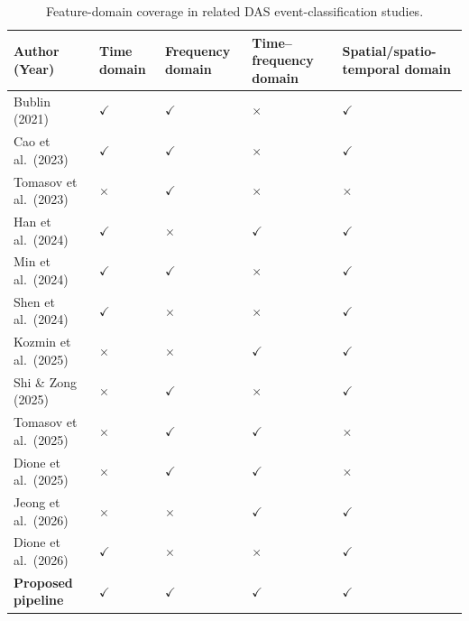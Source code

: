\begin{table}[H]
\centering
\caption{Feature-domain coverage in related DAS event-classification studies.}
\label{tab:feature-domain-coverage}
\footnotesize
\setlength{\tabcolsep}{4pt}
\renewcommand{\arraystretch}{1.25}
\begin{tabular}{@{}>{\raggedright\arraybackslash}p{4.0cm} >{\centering\arraybackslash}p{1.8cm} >{\centering\arraybackslash}p{2.1cm} >{\centering\arraybackslash}p{2.4cm} >{\centering\arraybackslash}p{3.0cm}@{}}
\toprule
\textbf{Author (Year)} & \textbf{Time domain} & \textbf{Frequency domain} & \textbf{Time--frequency domain} & \textbf{Spatial/spatio-temporal domain}\\
\midrule
Bublin (2021)~\cite{bublin2021event} & $\checkmark$ & $\checkmark$ & $\times$ & $\checkmark$\\
Cao et al.\ (2023)~\cite{caoxin2023opendataset} & $\checkmark$ & $\checkmark$ & $\times$ & $\checkmark$\\
Tomasov et al.\ (2023)~\cite{tomasov2023enhancing} & $\times$ & $\checkmark$ & $\times$ & $\times$\\
Han et al.\ (2024)~\cite{han2024intrusion} & $\checkmark$ & $\times$ & $\checkmark$ & $\checkmark$\\
Min et al.\ (2024)~\cite{min2024vehicle} & $\checkmark$ & $\checkmark$ & $\times$ & $\checkmark$\\
Shen et al.\ (2024)~\cite{shen2024abnormal} & $\checkmark$ & $\times$ & $\times$ & $\checkmark$\\
Kozmin et al.\ (2025)~\cite{kozmin2025wavelet} & $\times$ & $\times$ & $\checkmark$ & $\checkmark$\\
Shi \& Zong (2025)~\cite{shi2025benchmarking} & $\times$ & $\checkmark$ & $\times$ & $\checkmark$\\
Tomasov et al.\ (2025)~\cite{tomasov2025perimeter} & $\times$ & $\checkmark$ & $\checkmark$ & $\times$\\
Dione et al.\ (2025)~\cite{dione2025intrusion} & $\times$ & $\checkmark$ & $\checkmark$ & $\times$\\
Jeong et al.\ (2026)~\cite{jeong2026s2dygnn} & $\times$ & $\times$ & $\checkmark$ & $\checkmark$\\
Dione et al.\ (2026)~\cite{dione2026dastatformer} & $\checkmark$ & $\times$ & $\times$ & $\checkmark$\\
\midrule
\textbf{Proposed pipeline} & $\checkmark$ & $\checkmark$ & $\checkmark$ & $\checkmark$\\
\bottomrule
\end{tabular}
\end{table}

